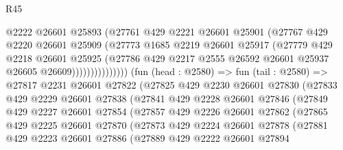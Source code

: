 \begin{lexlean}{R45}
\begin{coremodule}
                            @2222
                            @26601
                            @25893
                            (@27761
                              @429
                              @2221
                              @26601
                              @25901
                              (@27767
                                @429
                                @2220
                                @26601
                                @25909
                                (@27773
                                  @1685
                                  @2219
                                  @26601
                                  @25917
                                  (@27779
                                    @429
                                    @2218
                                    @26601
                                    @25925
                                    (@27786
                                      @429
                                      @2217
                                      @2555
                                      @26592
                                      @26601
                                      @25937
                                      @26605
                                      @26609)))))))))))))))
        (fun (head : @2580) =>
        fun (tail : @2580) =>
        @27817
          @2231
          @26601
          @27822
          (@27825
            @429
            @2230
            @26601
            @27830
            (@27833
              @429
              @2229
              @26601
              @27838
              (@27841
                @429
                @2228
                @26601
                @27846
                (@27849
                  @429
                  @2227
                  @26601
                  @27854
                  (@27857
                    @429
                    @2226
                    @26601
                    @27862
                    (@27865
                      @429
                      @2225
                      @26601
                      @27870
                      (@27873
                        @429
                        @2224
                        @26601
                        @27878
                        (@27881
                          @429
                          @2223
                          @26601
                          @27886
                          (@27889
                            @429
                            @2222
                            @26601
                            @27894

\end{coremodule}
\end{lexlean}
